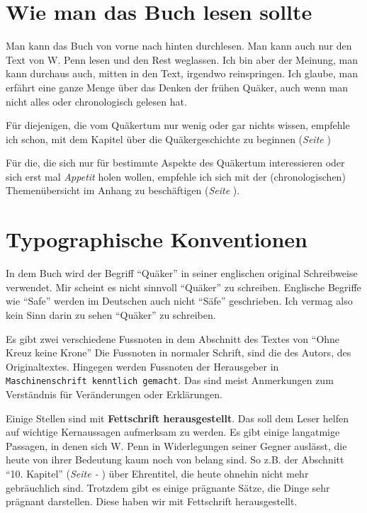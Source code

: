 \chapter{Wie man das Buch lesen sollte}

Man kann das Buch von vorne nach hinten durchlesen. Man kann auch nur den Text
von W. Penn lesen und den Rest weglassen. Ich bin aber der Meinung, man kann
durchaus auch, mitten in den Text, irgendwo reinspringen. Ich glaube, man
erfährt eine ganze Menge über das Denken der frühen Quäker, auch wenn man nicht
alles oder chronologisch gelesen hat.

\medskip

Für diejenigen, die vom Quäkertum nur wenig oder gar nichts wissen, empfehle ich
 schon, mit dem Kapitel über die Quäkergeschichte zu beginnen (\textit{Seite
\pageref{ref:entwicklung_Quäkertum}}) 

\medskip

Für die, die sich nur für bestimmte Aspekte des Quäkertum interessieren oder
sich erst mal \textit{Appetit} holen wollen, empfehle ich sich mit der
(chronologischen) Themenübersicht im Anhang zu beschäftigen (\textit{Seite
\pageref{ref:theme_nuebersicht}}).

\chapter{Typographische Konventionen}

In dem Buch wird der Begriff "`Quäker"'  in seiner
englischen original Schreibweise verwendet. Mir scheint es nicht sinnvoll
"`Quäker"' zu schreiben. Englische Begriffe wie "`Safe"' werden im Deutschen
auch nicht "`Säfe"' geschrieben. Ich vermag also kein Sinn darin zu sehen
"`Quäker"' zu schreiben.

\medskip

Es gibt zwei verschiedene Fussnoten in dem Abschnitt des Textes von "`Ohne Kreuz
keine Krone"' Die Fussnoten in normaler Schrift, sind die des Autors, des
Originaltextes. Hingegen werden Fussnoten der Herausgeber in
\texttt{Maschinenschrift kenntlich gemacht}. Das sind meist Anmerkungen zum
Verständnis für Veränderungen oder Erklärungen.
\medskip

Einige Stellen sind mit \textbf{Fettschrift herausgestellt}. Das soll dem Leser
helfen auf wichtige Kernaussagen aufmerksam zu werden. Es gibt einige langatmige
Passagen, in denen sich W. Penn in Widerlegungen seiner Gegner auslässt, die
heute von ihrer Bedeutung kaum noch von belang sind. So z.B. der Abschnitt
"`10. Kapitel"' (\textit{Seite \pageref{kap10} - \pageref{kap10_ende}}) über
Ehrentitel, die heute ohnehin nicht mehr gebräuchlich sind. Trotzdem gibt es
einige prägnante Sätze, die Dinge sehr prägnant darstellen. Diese haben wir mit
Fettschrift herausgestellt.
